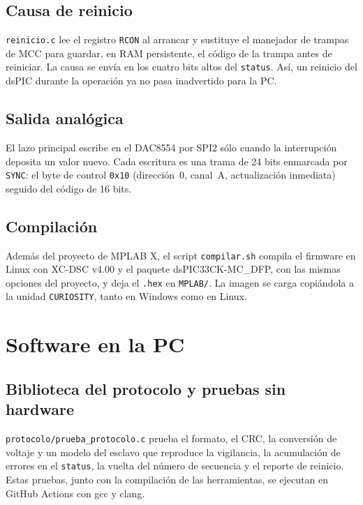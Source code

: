\documentclass[11pt]{article}
\newcommand{\code}[1]{\texttt{#1}}
\begin{document}
\subsection{Causa de reinicio}

\code{reinicio.c} lee el registro \code{RCON} al arrancar y sustituye el
manejador de trampas de MCC para guardar, en RAM persistente, el código de la
trampa antes de reiniciar. La causa se envía en los cuatro bits altos del
\code{status}. Así, un reinicio del dsPIC durante la operación ya no pasa
inadvertido para la PC.

\subsection{Salida analógica}

El lazo principal escribe en el DAC8554 por SPI2 sólo cuando la interrupción
deposita un valor nuevo. Cada escritura es una trama de 24 bits enmarcada por
\code{SYNC}: el byte de control \code{0x10} (dirección~0, canal~A,
actualización inmediata) seguido del código de 16 bits.

\subsection{Compilación}

Además del proyecto de MPLAB X, el script \code{compilar.sh} compila el
firmware en Linux con XC-DSC v4.00 y el paquete dsPIC33CK-MC\_DFP, con las
mismas opciones del proyecto, y deja el \code{.hex} en \code{MPLAB/}. La
imagen se carga copiándola a la unidad \code{CURIOSITY}, tanto en Windows
como en Linux.

\section{Software en la PC}

\subsection{Biblioteca del protocolo y pruebas sin hardware}

\code{protocolo/prueba\_protocolo.c} prueba el formato, el CRC, la
conversión de voltaje y un modelo del esclavo que reproduce la vigilancia, la
acumulación de errores en el \code{status}, la vuelta del número de
secuencia y el reporte de reinicio. Estas pruebas, junto con la compilación
de las herramientas, se ejecutan en GitHub Actions con gcc y clang.
\end{document}
